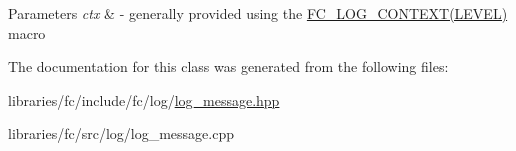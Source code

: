 \begin{DoxyParams}{Parameters}
{\em ctx} & -\/ generally provided using the \mbox{\hyperlink{log__message_8hpp_a123cc04b932788928fbe261f7c9bce5c}{F\+C\+\_\+\+L\+O\+G\+\_\+\+C\+O\+N\+T\+E\+X\+T(\+L\+E\+V\+E\+L)}} macro \\
\hline
\end{DoxyParams}


The documentation for this class was generated from the following files\+:\begin{DoxyCompactItemize}
\item 
libraries/fc/include/fc/log/\mbox{\hyperlink{log__message_8hpp}{log\+\_\+message.\+hpp}}\item 
libraries/fc/src/log/log\+\_\+message.\+cpp\end{DoxyCompactItemize}
